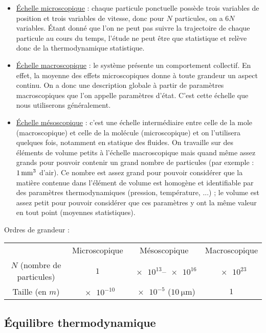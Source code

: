 \begin{itemize}
\item \underline{Échelle microscopique} : chaque particule ponctuelle possède trois variables de position et trois variables de vitesse, donc pour \(N\) particules, on a \(6N\) variables. Étant donné que l'on ne peut pas suivre la trajectoire de chaque particule au cours du temps, l'étude ne peut être que statistique et relève donc de la thermodynamique statistique.\\

\item \underline{Échelle macroscopique} : le système présente un comportement collectif. En effet, la moyenne des effets microscopiques donne à toute grandeur un aspect continu. On a donc une description globale à partir de paramètres macroscopiques que l'on appelle paramètres d'état. C'est cette échelle que nous utiliserons généralement.\\

\item \underline{Échelle mésoscopique} : c'est une échelle intermédiaire entre celle de la mole (macroscopique) et celle de la molécule (microscopique) et on l'utilisera quelques fois, notamment en statique des fluides. On travaille sur des éléments de volume petits à l'échelle macroscopique mais quand même assez grands pour pouvoir contenir un grand nombre de particules (par exemple : \(\SI{1}{mm\cubed}\) d'air). Ce nombre est assez grand pour pouvoir considérer que la matière contenue dans l'élément de volume est homogène et identifiable par des paramètres thermodynamiques (pression, température, ...) ; le volume est assez petit pour pouvoir considérer que ces paramètres y ont la même valeur en tout point (moyennes statistiques).
\end{itemize}

Ordres de grandeur :

\begin{tabular}{c|c|c|c}
& Microscopique & Mésoscopique & Macroscopique \\[1em]
\(N\) (nombre de particules) & \(\num{1}\) & \(\numrange{e13}{e16}\) & \(\num{e23}\) \\[1em]
Taille (en \(\unit{m}\)) & \(\num{e-10}\) & \(\num{e-5}\) (\(\SI{10}{\micro\metre}\)) & \(\num{1}\)
\end{tabular}

\subsection{Équilibre thermodynamique}

